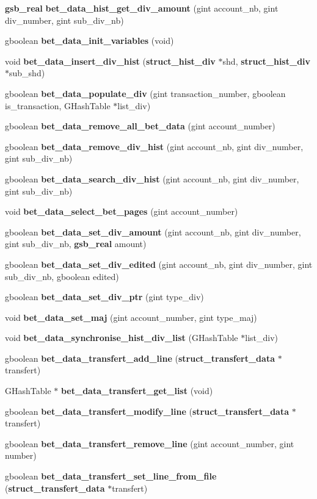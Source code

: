 \begin{DoxyCompactItemize}
{\bf gsb\_\-real} {\bf bet\_\-data\_\-hist\_\-get\_\-div\_\-amount} (gint account\_\-nb, gint div\_\-number, gint sub\_\-div\_\-nb)
\item 
gboolean {\bf bet\_\-data\_\-init\_\-variables} (void)
\item 
void {\bf bet\_\-data\_\-insert\_\-div\_\-hist} ({\bf struct\_\-hist\_\-div} $\ast$shd, {\bf struct\_\-hist\_\-div} $\ast$sub\_\-shd)
\item 
gboolean {\bf bet\_\-data\_\-populate\_\-div} (gint transaction\_\-number, gboolean is\_\-transaction, GHashTable $\ast$list\_\-div)
\item 
gboolean {\bf bet\_\-data\_\-remove\_\-all\_\-bet\_\-data} (gint account\_\-number)
\item 
gboolean {\bf bet\_\-data\_\-remove\_\-div\_\-hist} (gint account\_\-nb, gint div\_\-number, gint sub\_\-div\_\-nb)
\item 
gboolean {\bf bet\_\-data\_\-search\_\-div\_\-hist} (gint account\_\-nb, gint div\_\-number, gint sub\_\-div\_\-nb)
\item 
void {\bf bet\_\-data\_\-select\_\-bet\_\-pages} (gint account\_\-number)
\item 
gboolean {\bf bet\_\-data\_\-set\_\-div\_\-amount} (gint account\_\-nb, gint div\_\-number, gint sub\_\-div\_\-nb, {\bf gsb\_\-real} amount)
\item 
gboolean {\bf bet\_\-data\_\-set\_\-div\_\-edited} (gint account\_\-nb, gint div\_\-number, gint sub\_\-div\_\-nb, gboolean edited)
\item 
gboolean {\bf bet\_\-data\_\-set\_\-div\_\-ptr} (gint type\_\-div)
\item 
void {\bf bet\_\-data\_\-set\_\-maj} (gint account\_\-number, gint type\_\-maj)
\item 
void {\bf bet\_\-data\_\-synchronise\_\-hist\_\-div\_\-list} (GHashTable $\ast$list\_\-div)
\item 
gboolean {\bf bet\_\-data\_\-transfert\_\-add\_\-line} ({\bf struct\_\-transfert\_\-data} $\ast$transfert)
\item 
GHashTable $\ast$ {\bf bet\_\-data\_\-transfert\_\-get\_\-list} (void)
\item 
gboolean {\bf bet\_\-data\_\-transfert\_\-modify\_\-line} ({\bf struct\_\-transfert\_\-data} $\ast$transfert)
\item 
gboolean {\bf bet\_\-data\_\-transfert\_\-remove\_\-line} (gint account\_\-number, gint number)
\item 
gboolean {\bf bet\_\-data\_\-transfert\_\-set\_\-line\_\-from\_\-file} ({\bf struct\_\-transfert\_\-data} $\ast$transfert)

\end{DoxyCompactItemize}
